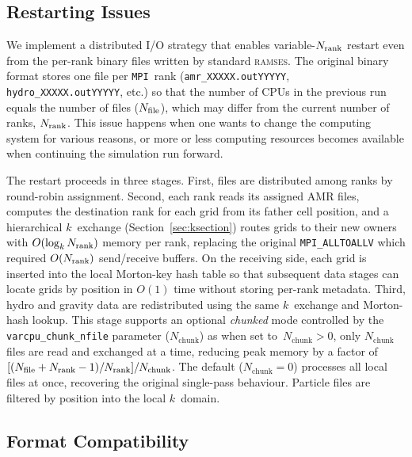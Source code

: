 \documentclass[fleqn,usenatbib]{mnras}
\newcommand{\ramses}{\textsc{ramses}}
\newcommand{\nrank}{N_{\rm rank}}
\newcommand{\nfile}{N_{\rm file}}
\newcommand{\ksec}{\ensuremath{k}\text{-section}}
\newcommand{\code}[1]{\texttt{#1}}
\newcommand{\mpi}[0]{\texttt{MPI}}
\begin{document}
\subsection{Restarting Issues}
\label{sec:varcpu_binary}

We implement a distributed I/O strategy that
enables variable-$\nrank$ restart even from the per-rank binary files written by standard \ramses.  The original binary format stores one file per
\mpi\ rank (\code{amr\_XXXXX.outYYYYY},
\code{hydro\_XXXXX.outYYYYY}, etc.) so that the number of CPUs in the previous run equals the number of files
($\nfile$), which may differ from the current number of ranks, $\nrank$. This issue happens when one wants to change the computing system for various reasons, or more or less computing resources becomes available when continuing the simulation run forward.

The restart proceeds in three stages.
First, files are distributed among ranks by round-robin assignment.
Second, each rank reads its assigned AMR files, computes the
destination rank for each grid from its father cell position,
and a hierarchical \ksec\ exchange (Section~\ref{sec:ksection})
routes grids to their new owners with $O(\log_k \nrank)$ memory
per rank, replacing the original \code{MPI\_ALLTOALLV} which
required $O(\nrank)$ send/receive buffers.
On the receiving side, each grid is inserted into the local
Morton-key hash table so that subsequent data stages can
locate grids by position in $O(1)$ time without storing
per-rank metadata.
Third, hydro and gravity data are redistributed using the
same \ksec\ exchange and Morton-hash lookup.
This stage supports an optional \emph{chunked} mode
controlled by the \code{varcpu\_chunk\_nfile} parameter ($N_\textrm{chunk}$) as
when set to~$N_\textrm{chunk}>0$, only $N_\textrm{chunk}$ files are read and exchanged
at a time, reducing peak memory by a factor of
$[( \nfile + \nrank-1) / \nrank ] / N_\textrm{chunk}$.
The default ($N_\textrm{chunk}=0$) processes all local files at once,
recovering the original single-pass behaviour.
Particle files are filtered by position into the local
\ksec\ domain.

\subsection{Format Compatibility}
\label{sec:varcpu_compat}
\end{document}
